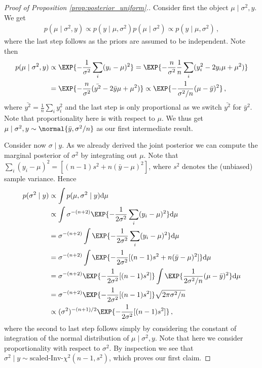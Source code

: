 \begin{proof}[Proof of Proposition \ref{prop:posterior_uniform}.]
  Consider first the object $\mu \mid \sigma^2, y$.
  We get
  \begin{align*}
    p(\mu \mid \sigma^2, y) \propto p(y \mid \mu, \sigma^2) p(\mu \mid \sigma^2) \propto p(y \mid \mu, \sigma^2) \,,
  \end{align*}
  where the last step follows as the priors are assumed to be independent.
  Note then
  \begin{align*}
    p(\mu \mid \sigma^2, y) &\propto \EXP{-\frac{1}{\sigma^2}\sum_i (y_i - \mu)^2} = \EXP{-\frac{n}{\sigma^2} \frac{1}{n}\sum_i (y_i^2 - 2y_i \mu + \mu^2)}\\
    &=\EXP{-\frac{n}{\sigma^2} (\bar{y^2} - 2 \bar{y} \mu + \mu^2)} \propto
    \EXP{-\frac{1}{\sigma^2 / n} (\mu - \bar{y})^2} \,,
  \end{align*}
  where $\bar{y^2} = \frac{1}{n}\sum_i y_i^2$ and the last step is only proportional as we switch $\bar{y^2}$ for $\bar{y}^2$.
  Note that proportionality here is with respect to $\mu$.
  We thus get $\mu \mid \sigma^2, y \sim \normal{\bar{y}, \sigma^2/n}$ as our first intermediate result.

  Consider now $\sigma \mid y$.
  As we already derived the joint posterior we can compute the marginal posterior of $\sigma^2$ by integrating out $\mu$.
  Note that $\sum_i (y_i - \mu)^2 = [(n-1)s^2 + n(\bar{y} - \mu)^2]$, where $s^2$ denotes the (unbiased) sample variance. Hence
  \begin{align*}
    p(\sigma^2 \mid y) &\propto \int p(\mu, \sigma^2 \mid y) \mathrm{d} \mu\\
    &\propto \int \sigma^{-(n+2)} \EXP{-\frac{1}{2\sigma^2}\sum_i (y_i - \mu)^2} \mathrm{d} \mu\\
    &= \sigma^{-(n+2)} \int \EXP{-\frac{1}{2\sigma^2}\sum_i (y_i - \mu)^2} \mathrm{d} \mu\\
    &= \sigma^{-(n+2)} \int \EXP{-\frac{1}{2\sigma^2}[(n-1) s^2 + n(\bar{y} - \mu)^2]} \mathrm{d} \mu\\
    &= \sigma^{-(n+2)} \EXP{-\frac{1}{2\sigma^2}[(n-1) s^2]} \int \EXP{\frac{1}{2\sigma^2/n}(\mu - \bar{y})^2} \mathrm{d} \mu\\
    &= \sigma^{-(n+2)} \EXP{-\frac{1}{2\sigma^2}[(n-1) s^2]} \sqrt{2 \pi \sigma^2 / n} \\
    &\propto (\sigma^2)^{-(n+1)/2} \EXP{-\frac{1}{2\sigma^2}[(n-1) s^2]} \,,
  \end{align*}
  where the second to last step follows simply by considering the constant of integration of the normal distribution of $\mu \mid \sigma^2, y$.
  Note that here we consider proportionality with respect to $\sigma^2$.
  By inspection we see that $\sigma^2 \mid y \sim \text{scaled-Inv-} \chi^2(n-1, s^2)$, which proves our first claim.


\end{proof}
